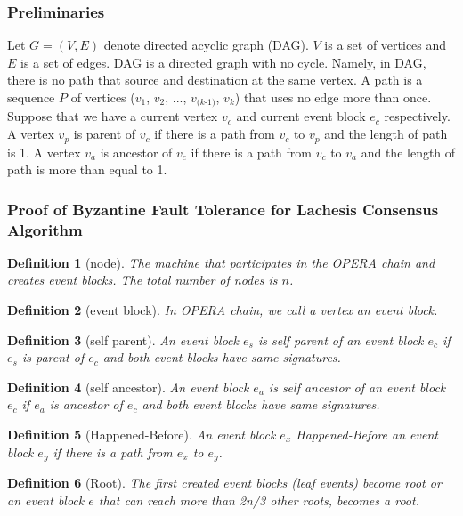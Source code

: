 \documentclass[preprint,12pt]{elsarticle}
\newtheorem{defn}{Definition}[section]
\begin{document}
\subsubsection{Preliminaries}
Let $G=(V, E)$ denote directed acyclic graph (DAG). $V$ is a set of vertices and $E$ is a set of edges. DAG is a directed graph with no cycle. Namely, in DAG, there is no path that source and destination at the same vertex. 
A path is a sequence $P$ of vertices ($v_1$, $v_2$, ..., $v_\textit{(k-1)}$, $v_k$) that uses no edge more than once. Suppose that we have a current vertex $v_c$ and current event block $e_c$ respectively.
A vertex $v_p$ is parent of $v_c$ if there is a path from $v_c$ to $v_p$ and the length of path is 1. 
A vertex $v_a$ is ancestor of $v_c$ if there is a path from $v_c$ to $v_a$ and the length of path is more than equal to 1.

\subsubsection{Proof of Byzantine Fault Tolerance for Lachesis Consensus Algorithm}
\begin{defn}[node]
The machine that participates in the OPERA chain and creates event blocks. The total number of nodes is $n$.
\end{defn}

\begin{defn}[event block]
In OPERA chain, we call a vertex an event block.
\end{defn}

\begin{defn}[self parent]
An event block $e_s$ is self parent of an event block $e_c$ if $e_s$ is parent of $e_c$ and both event blocks have same signatures. 
\end{defn}

\begin{defn}[self ancestor]
An event block $e_a$ is self ancestor of an event block $e_c$ if $e_a$ is ancestor of $e_c$ and both event blocks have same signatures. 
\end{defn}

\begin{defn}[Happened-Before]
An event block $e_x$ Happened-Before an event block $e_y$ if there is a path from $e_x$ to $e_y$.
\end{defn}

\begin{defn}[Root]
The first created event blocks (leaf events) become root or an event block $e$ that can reach more than 2n/3 other roots, becomes a root. 
\end{defn}
\end{document}
